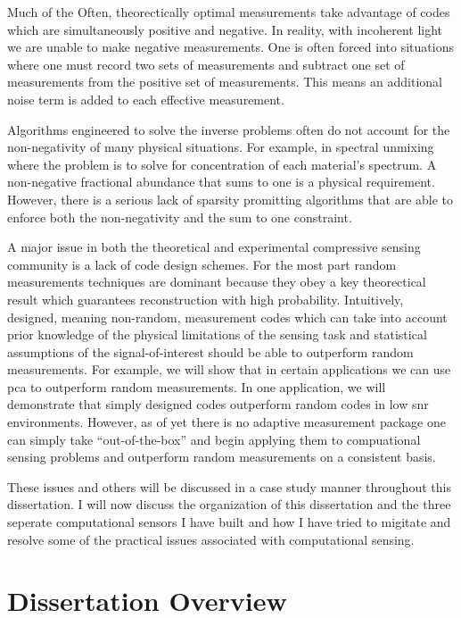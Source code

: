 Much of the Often, theorectically optimal measurements take advantage of codes which are simultaneously positive and negative. In reality, with incoherent light we are unable to make negative measurements. One is often forced into situations where one must record two sets of measurements and subtract one set of measurements from the positive set of measurements. This means an additional noise term is added to each effective measurement. 

Algorithms engineered to solve the inverse problems often do not account for the non-negativity of many physical situations. For example, in spectral unmixing where the problem is to solve for concentration of each material's spectrum. A non-negative fractional abundance that sums to one is a physical requirement. However, there is a serious lack of sparsity promitting algorithms that are able to enforce both the non-negativity and the sum to one constraint. 

A major issue in both the theoretical and experimental compressive sensing community is a lack of code design schemes. For the most part random measurements techniques are dominant because they obey a key theorectical result which guarantees reconstruction with high probability. Intuitively, designed, meaning non-random, measurement codes which can take into account prior knowledge of the physical limitations of the sensing task and statistical assumptions of the signal-of-interest should be able to outperform random measurements. For example, we will show that in certain applications we can use \gls{pca} to outperform random measurements. In one application, we will demonstrate that simply designed codes outperform random codes in low \gls{snr} environments. However, as of yet there is no adaptive measurement package one can simply take  ``out-of-the-box'' and begin applying them to compuational sensing problems and outperform random measurements on a consistent basis.

These issues and others will be discussed in a case study manner throughout this dissertation. I will now discuss the organization of this dissertation and the three seperate computational sensors I have built and how I have tried to migitate and resolve some of the practical issues associated with computational sensing.

\section{Dissertation Overview}

